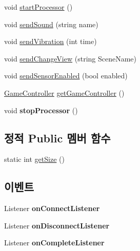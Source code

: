 \begin{DoxyCompactItemize}
\item 
void \hyperlink{class_server_manager_1_1_g_c_packet_processor_a84746f1af9c687835fb20e58dd65824c}{start\+Processor} ()
\item 
void \hyperlink{class_server_manager_1_1_g_c_packet_processor_af10653ddaeee59e9c300a70a3780457f}{send\+Sound} (string name)
\item 
void \hyperlink{class_server_manager_1_1_g_c_packet_processor_a95466c00108da09905e499103d60c8cb}{send\+Vibration} (int time)
\item 
void \hyperlink{class_server_manager_1_1_g_c_packet_processor_a8baeb542bcec06b8e4f16ae7417896fb}{send\+Change\+View} (string Scene\+Name)
\item 
void \hyperlink{class_server_manager_1_1_g_c_packet_processor_a74a8d49584a0dc8599c1a7dff4d2dc28}{send\+Sensor\+Enabled} (bool enabled)
\item 
\hyperlink{class_game_controller}{Game\+Controller} \hyperlink{class_server_manager_1_1_g_c_packet_processor_a35d3770455e7d5ee73c8ae315c5bd1ce}{get\+Game\+Controller} ()
\item 
\hypertarget{class_server_manager_1_1_g_c_packet_processor_a6789b1d7291851798a6b2231539b14b8}{}void {\bfseries stop\+Processor} ()\label{class_server_manager_1_1_g_c_packet_processor_a6789b1d7291851798a6b2231539b14b8}

\end{DoxyCompactItemize}
\subsection*{정적 Public 멤버 함수}
\begin{DoxyCompactItemize}
\item 
static int \hyperlink{class_server_manager_1_1_g_c_packet_processor_a714bda3a3df86d6e7164866313441d6b}{get\+Size} ()
\end{DoxyCompactItemize}
\subsection*{이벤트}
\begin{DoxyCompactItemize}
\item 
\hypertarget{class_server_manager_1_1_g_c_packet_processor_aaf4f9fa7a203db3ad388adfacf453e49}{}Listener {\bfseries on\+Connect\+Listener}\label{class_server_manager_1_1_g_c_packet_processor_aaf4f9fa7a203db3ad388adfacf453e49}

\item 
\hypertarget{class_server_manager_1_1_g_c_packet_processor_a77b08a46b3f2e975423eeb8ee62b9980}{}Listener {\bfseries on\+Disconnect\+Listener}\label{class_server_manager_1_1_g_c_packet_processor_a77b08a46b3f2e975423eeb8ee62b9980}

\item 
\hypertarget{class_server_manager_1_1_g_c_packet_processor_adf20c3a863d86c5edbf1d9334d5bef32}{}Listener {\bfseries on\+Complete\+Listener}\label{class_server_manager_1_1_g_c_packet_processor_adf20c3a863d86c5edbf1d9334d5bef32}

\end{DoxyCompactItemize}


